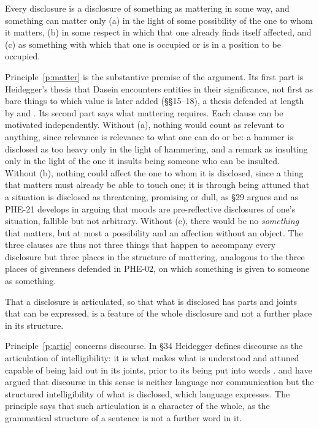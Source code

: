 \documentclass{situationist-preprint}
\begin{document}
\begin{principle}\label{p:matter}
Every disclosure is a disclosure of something as mattering in some way, and something can matter only (a) in the light of some possibility of the one to whom it matters, (b) in some respect in which that one already finds itself affected, and (c) as something with which that one is occupied or is in a position to be occupied.
\end{principle}

Principle~\ref{p:matter} is the substantive premise of the argument. Its first part is Heidegger's thesis that Dasein encounters entities in their significance, not first as bare things to which value is later added (\S\S15--18), a thesis defended at length by \citet{Dreyfus1991} and \citet{Haugeland1982}. Its second part says what mattering requires. Each clause can be motivated independently. Without (a), nothing would count as relevant to anything, since relevance is relevance to what one can do or be: a hammer is disclosed as too heavy only in the light of hammering, and a remark as insulting only in the light of the one it insults being someone who can be insulted. Without (b), nothing could affect the one to whom it is disclosed, since a thing that matters must already be able to touch one; it is through being attuned that a situation is disclosed as threatening, promising or dull, as \S29 argues and as PHE-21 develops in arguing that moods are pre-reflective disclosures of one's situation, fallible but not arbitrary. Without (c), there would be no \emph{something} that matters, but at most a possibility and an affection without an object. The three clauses are thus not three things that happen to accompany every disclosure but three places in the structure of mattering, analogous to the three places of givenness defended in PHE-02, on which something is given to someone as something.

\begin{principle}\label{p:artic}
That a disclosure is articulated, so that what is disclosed has parts and joints that can be expressed, is a feature of the whole disclosure and not a further place in its structure.
\end{principle}

Principle~\ref{p:artic} concerns discourse. In \S34 Heidegger defines discourse as the articulation of intelligibility: it is what makes what is understood and attuned capable of being laid out in its joints, prior to its being put into words \citep[\S34]{Heidegger1927}. \citet{Carman2003} and \citet{Wrathall2010} have argued that discourse in this sense is neither language nor communication but the structured intelligibility of what is disclosed, which language expresses. The principle says that such articulation is a character of the whole, as the grammatical structure of a sentence is not a further word in it.
\end{document}
